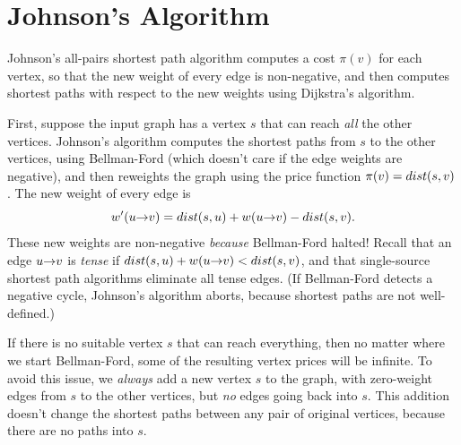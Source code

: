 \section{Johnson's Algorithm}
\label{sec:9.4}

Johnson’s all-pairs shortest path algorithm computes a cost $\pi(v)$ for each vertex, so that the new weight of every edge is non-negative, and then computes shortest paths with respect to the new weights using Dijkstra’s algorithm.

First, suppose the input graph has a vertex $s$ that can reach \textit{all} the other vertices.
Johnson’s algorithm computes the shortest paths from $s$ to the other vertices, using Bellman-Ford (which doesn’t care if the edge weights are negative), and then reweights the graph using the price function $\pi(v) = dist(s, v)$.
The new weight of every edge is
\[
w'(u\mathord{\rightarrow}v) = dist(s, u) + w(u\mathord{\rightarrow}v) - dist(s, v).
\]
These new weights are non-negative \textit{because} Bellman-Ford halted!
Recall that an edge $u\mathord{\rightarrow}v$ is \textit{tense} if $dist(s, u) + w(u\mathord{\rightarrow}v) < dist(s, v)$, and that single-source shortest path algorithms eliminate all tense edges. (If Bellman-Ford detects a negative cycle, Johnson’s algorithm aborts, because shortest paths are not well-defined.)

If there is no suitable vertex $s$ that can reach everything, then no matter where we start Bellman-Ford, some of the resulting vertex prices will be infinite.
To avoid this issue, we \textit{always} add a new vertex $s$ to the graph, with zero-weight edges from $s$ to the other vertices, but \textit{no} edges going back into $s$.
This addition doesn’t change the shortest paths between any pair of original vertices, because there are no paths into $s$.

